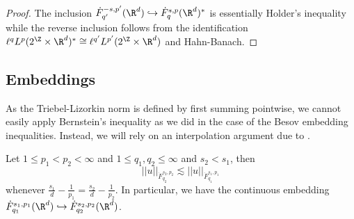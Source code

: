 \begin{proof}\cite[Theorem 2.11.2]{Triebel1983}
	The inclusion $\dot F^{-s, p'}_{q'} (\R^d) \hookrightarrow \dot F^{s, p}_{q} (\R^d)^* $ is essentially Holder's inequality while the reverse inclusion follows from the identification $\ell^q L^p (2^\Z \times \R^d)^* \cong \ell^{q'} L^{p'} (2^\Z \times \R^d)$ and Hahn-Banach. 
\end{proof}

\subsection{Embeddings}

As the Triebel-Lizorkin norm is defined by first summing pointwise, we cannot easily apply Bernstein's inequality as we did in the case of the Besov embedding inequalities. Instead, we will rely on an interpolation argument due to \cite{BrezisMironescu2001}. 

\begin{theorem}
	Let $1 \leq p_1 < p_2 < \infty$ and $1 \leq q_1, q_2 \leq \infty$ and $s_2 < s_1$, then
		\[ || u ||_{\dot F^{s_2, p_2}_{q_2}} \lesssim || u ||_{\dot F^{s_1, p_1}_{q_1}} \]
	whenever $\frac{s_1}{d} - \frac{1}{p_1} = \frac{s_2}{d} - \frac{1}{p_2}$. In particular, we have the continuous embedding $\dot F^{s_1, p_1}_{q_1} (\R^d) \hookrightarrow \dot F^{s_2, p_2}_{q_2} (\R^d)$.
\end{theorem}

